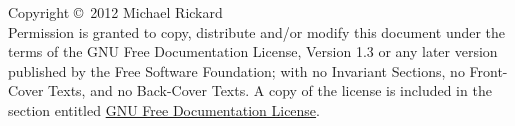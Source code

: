 \vspace*{6in}

Copyright \copyright~2012 Michael Rickard \\

Permission is granted to copy, distribute and/or modify this document
under the terms of the GNU Free Documentation License, Version 1.3
or any later version published by the Free Software Foundation;
with no Invariant Sections, no Front-Cover Texts, and no Back-Cover
Texts.  A copy of the license is included in the section entitled
\hyperlink{license}{GNU Free Documentation License}.
